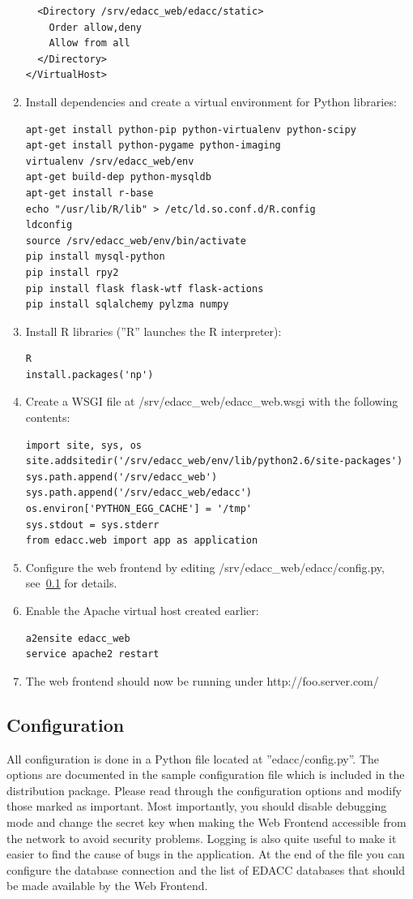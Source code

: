 \begin{enumerate}
{\begin{verbatim}
  <Directory /srv/edacc_web/edacc/static>
    Order allow,deny
    Allow from all
  </Directory>
</VirtualHost>
\end{verbatim}
}
\item{Install dependencies and create a virtual environment for Python libraries:
\begin{verbatim}
apt-get install python-pip python-virtualenv python-scipy
apt-get install python-pygame python-imaging
virtualenv /srv/edacc_web/env
apt-get build-dep python-mysqldb
apt-get install r-base
echo "/usr/lib/R/lib" > /etc/ld.so.conf.d/R.config
ldconfig
source /srv/edacc_web/env/bin/activate
pip install mysql-python
pip install rpy2
pip install flask flask-wtf flask-actions
pip install sqlalchemy pylzma numpy
\end{verbatim}
}
\item{Install R libraries (''R'' launches the R interpreter):
\begin{verbatim}
R
install.packages('np')
\end{verbatim}
}
\item{Create a WSGI file at /srv/edacc\_web/edacc\_web.wsgi with the following contents:
\begin{verbatim}
import site, sys, os
site.addsitedir('/srv/edacc_web/env/lib/python2.6/site-packages')
sys.path.append('/srv/edacc_web')
sys.path.append('/srv/edacc_web/edacc')
os.environ['PYTHON_EGG_CACHE'] = '/tmp'
sys.stdout = sys.stderr
from edacc.web import app as application
\end{verbatim}
}
\item Configure the web frontend by editing /srv/edacc\_web/edacc/config.py, see~\ref{wf:configuration} for details.
\item{Enable the Apache virtual host created earlier:
\begin{verbatim}
a2ensite edacc_web
service apache2 restart
\end{verbatim}
}
\item The web frontend should now be running under http://foo.server.com/
\end{enumerate}

\subsection{Configuration}
\label{wf:configuration}
All configuration is done in a Python file located at ''edacc/config.py''. The options are documented in the sample configuration
file which is included in the distribution package. Please read through the configuration options and modify those marked as important. \attention
Most importantly, you should disable debugging mode and change the secret key when making the Web Frontend
accessible from the network to avoid security problems. Logging is also quite useful to make it easier to find the cause of bugs in the application.
At the end of the file you can configure the database connection and the list of EDACC databases that should be
made available by the Web Frontend.

